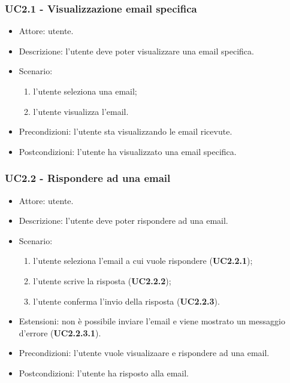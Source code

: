     \subsubsection{UC2.1 - Visualizzazione email specifica}
    \begin{itemize}
        \item Attore: utente.
        \item Descrizione: l'utente deve poter visualizzare una email specifica.
        \item Scenario:
        \begin{enumerate}
        \item l'utente seleziona una email;
        \item l'utente visualizza l'email.
        \end{enumerate}
        \item Precondizioni: l'utente sta visualizzando le email ricevute.
        \item Postcondizioni: l'utente ha visualizzato una email specifica.
    \end{itemize}

    \subsubsection{UC2.2 - Rispondere ad una email}
    \begin{itemize}
        \item Attore: utente.
        \item Descrizione: l'utente deve poter rispondere ad una email.
        \item Scenario:
        \begin{enumerate}
        \item l'utente seleziona l'email a cui vuole rispondere (\textbf{UC2.2.1});
        \item l'utente scrive la risposta (\textbf{UC2.2.2});
        \item l'utente conferma l'invio della risposta (\textbf{UC2.2.3}).
        \end{enumerate}
        \item Estensioni: non è possibile inviare l'email e viene mostrato un messaggio d'errore (\textbf{UC2.2.3.1}).
        \item Precondizioni: l'utente vuole visualizaare e rispondere ad una email.
        \item Postcondizioni: l'utente ha risposto alla email.
    \end{itemize}

